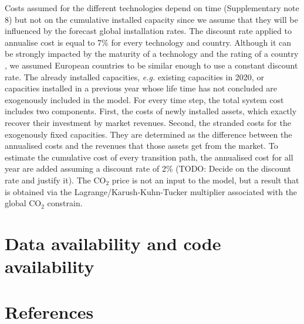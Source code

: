 \documentclass[5p]{elsarticle} %
\begin{document}
Costs assumed for the different technologies depend on time (Supplementary note 8) but not on the cumulative installed capacity since we assume that they will be influenced by the forecast global installation rates. The discount rate applied to annualise cost is equal to 7\% for every technology and country. Although it can be strongly impacted by the maturity of a technology and the rating of a country \cite{Egli_2019}, we assumed European countries to be similar enough to use a constant discount rate.  The already installed capacities, \textit{e.g.} existing capacities in 2020, or capacities installed in a previous year whose life time has not concluded are exogenously included in the model. For every time step, the total system cost includes two components. First, the costs of newly installed assets, which exactly recover their investment by market revenues. Second, the stranded costs for the exogenously fixed capacities. They are determined as the difference between the annualised costs and the revenues that those assets get from the market.  To estimate the cumulative cost of every transition path, the annualised cost for all year are added assuming a discount rate of \textcolor[rgb]{1,0,0}{2\% (TODO: Decide on the discount rate and justify it)}. %
The CO$_2$ price is not an input to the model, but a result that is obtained via the Lagrange/Karush-Kuhn-Tucker multiplier associated with the global CO$_2$ constrain. 

\section{Data availability and code availability}

\section{References}

\end{document}

